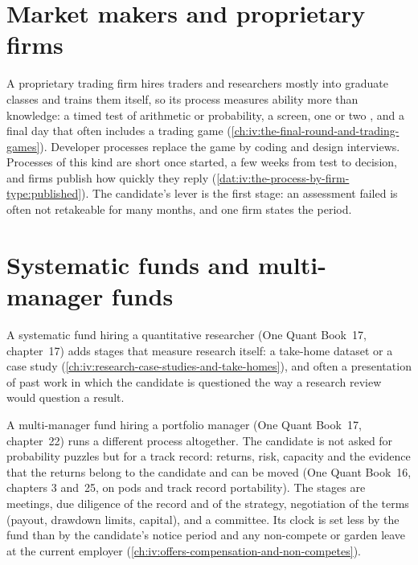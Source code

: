 \begin{omfigure}
\label{fig:iv:the-process-by-firm-type:stages}
\end{omfigure}

\section{Market makers and proprietary firms}

A proprietary trading firm hires traders and researchers mostly into graduate classes and trains them itself,
so its process measures ability more than knowledge: a timed test of arithmetic or probability, a screen, one
or two , and a final day that often includes a trading game
(\cref{ch:iv:the-final-round-and-trading-games}). Developer processes replace the game by coding and design
interviews. Processes of this kind are short once started, a few weeks from test to decision, and firms
publish how quickly they reply (\cref{dat:iv:the-process-by-firm-type:published}). The candidate's lever is
the first stage: an assessment failed is often not retakeable for many months, and one firm states the
period.

\section{Systematic funds and multi-manager funds}

A systematic fund hiring a quantitative researcher (One Quant Book~17, chapter~17) adds stages that measure
research itself: a take-home dataset or a case study (\cref{ch:iv:research-case-studies-and-take-homes}),
and often a presentation of past work in which the candidate is questioned the way a research review would
question a result.

A multi-manager fund hiring a portfolio manager (One Quant Book~17, chapter~22) runs a different process
altogether. The candidate is not asked for probability puzzles but for a track record: returns, risk, capacity
and the evidence that the returns belong to the candidate and can be moved (One Quant Book~16, chapters 3
and~25, on pods and track record portability). The stages are meetings, due diligence of the record and of
the strategy, negotiation of the terms (payout, drawdown limits, capital), and a committee. Its clock is set
less by the fund than by the candidate's notice period and any non-compete or garden leave at the current
employer (\cref{ch:iv:offers-compensation-and-non-competes}).

